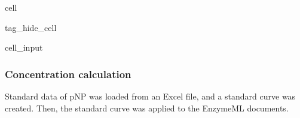 \documentclass[letterpaper,12pt,english]{jupyterBook}
\begin{document}
\begin{sphinxuseclass}{cell}
\begin{sphinxuseclass}{tag_hide_cell}\begin{sphinxVerbatimInput}

\begin{sphinxuseclass}{cell_input}
\begin{sphinxVerbatim}[commandchars=\\\{\}]
 \PYG{p}{[}\PYG{p}{]}\PYG{p}{[}\PYG{p}{]}\PYG{p}{[}\PYG{p}{]}
\end{sphinxVerbatim}

\end{sphinxuseclass}\end{sphinxVerbatimInput}

\end{sphinxuseclass}
\end{sphinxuseclass}

\subsubsection{Concentration calculation}
\label{\detokenize{scenarios/glycosidase_inhibition:concentration-calculation}}
\sphinxAtStartPar
Standard data of p\sphinxhyphen{}NP was loaded from an Excel file, and a standard curve was created. Then, the standard curve was applied to the EnzymeML documents.
\end{document}
